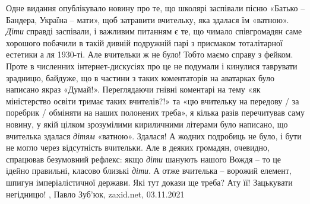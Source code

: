 Одне видання опублікувало новину про те, що школярі заспівали пісню «Батько –
Бандера, Україна – мати», щоб затравити вчительку, яка здалася їм «ватною».
\emph{Діти} справді заспівали, і важливим питанням є те, що чимало співгромадян
саме хорошого побачили в такій дивній подружній парі з присмаком тоталітарної
естетики а ля 1930-ті. Але вчительки ж не було! Тобто маємо справу з фейком.
Проте в численних інтернет-дискусіях про це не подумали і кинулися таврувати
зрадницю, байдуже, що в частини з таких коментаторів на аватарках було написано
якраз «Думай!».  Переглядаючи гнівні коментарі на тему «як міністерство освіти
тримає таких вчителів?!» та «цю вчительку на передову / за поребрик / обміняти
на наших полонених треба», я кілька разів перечитував саму новину, у якій
цілком зрозумілими кириличними літерами було написано, що вчителька здалася
\emph{дітям} «ватною». Здалася! А жодних подробиць не було, і бути не могло
через відсутність вчительки. Але в деяких громадян, очевидно, спрацював
безумовний рефлекс: якщо \emph{діти} шанують нашого Вождя – то це ідейно
правильні, класово близькі \emph{діти}. А отже вчителька – ворожий елемент,
шпигун імперіалістичної держави. Які тут докази ще треба? Ату її! Зацькувати
негідницю!
, Павло Зуб'юк, zaxid.net, 03.11.2021

